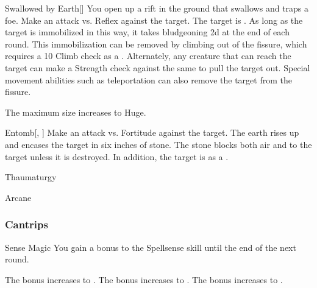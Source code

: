 \lowercase{\hypertarget{spell:Swallowed by Earth}{}}\label{spell:Swallowed by Earth}
\begin{freeability}[Rank 6]{\hypertarget{spell:Swallowed by Earth}{Swallowed by Earth}}[]
You open up a rift in the ground that swallows and traps a foe.
Make an attack vs. Reflex against the target.
\hit The target is .
As long as the target is immobilized in this way,
it takes bludgeoning  \minus2d at the end of each round.
This immobilization can be removed by climbing out of the fissure, which requires a  10 Climb check as a .
Alternately, any creature that can reach the target can make a Strength check against the same  to pull the target out.
Special movement abilities such as teleportation can also remove the target from the fissure.

\rankline
{} The maximum size increases to Huge.
\end{freeability}
\vspace{0.25em}



\lowercase{\hypertarget{spell:Entomb}{}}\label{spell:Entomb}
\begin{freeability}[Rank 8]{\hypertarget{spell:Entomb}{Entomb}}[, ]
Make an attack vs. Fortitude against the target.
\hit The earth rises up and encases the target in six inches of stone.
The stone blocks both air and  to the target unless it is destroyed.
In addition, the target is  as a .
\end{freeability}
\vspace{0.25em}


\newpage
\begin{spellsection}{Thaumaturgy}

\begin{spellheader}
\end{spellheader}


 Arcane

\subsubsection{Cantrips}


\begin{freeability}{Sense Magic}
You gain a  bonus to the Spellsense skill until the end of the next round.

\rankline
{} The bonus increases to .
 The bonus increases to .
 The bonus increases to .
\end{freeability}

\end{spellsection}


